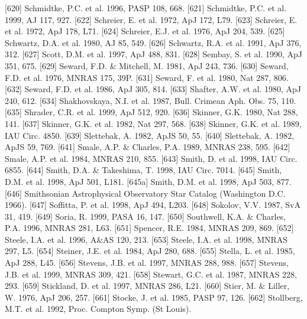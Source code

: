 \documentclass{aa}
\begin{document}
\begin{thebibliography}{}
\bibitem[]{}[620] Schmidtke, P.C. et al. 1996, PASP 108, 668.
\bibitem[]{}[621] Schmidtke, P.C. et al. 1999, AJ 117, 927.
\bibitem[]{}[622] Schreier, E. et al. 1972, ApJ 172, L79.
\bibitem[]{}[623] Schreier, E. et al. 1972, ApJ 178, L71.
\bibitem[]{}[624] Schreier, E.J. et al. 1976, ApJ 204, 539.
\bibitem[]{}[625] Schwartz, D.A. et al. 1980, AJ 85, 549.
\bibitem[]{}[626] Schwartz, R.A. et al. 1991, ApJ 376, 312.
\bibitem[]{}[627] Scott, D.M. et al. 1997, ApJ 488, 831.
\bibitem[]{}[628] Sembay, S. et al. 1990, ApJ 351, 675.
\bibitem[]{}[629] Seward, F.D. \& Mitchell, M. 1981, ApJ 243, 736.
\bibitem[]{}[630] Seward, F.D. et al. 1976, MNRAS 175, 39P.
\bibitem[]{}[631] Seward, F. et al. 1980, Nat 287, 806.
\bibitem[]{}[632] Seward, F.D. et al. 1986, ApJ 305, 814.
\bibitem[]{}[633] Shafter, A.W. et al. 1980, ApJ 240, 612.
\bibitem[]{}[634] Shakhovskaya, N.I. et al. 1987, Bull. Crimean Aph. Obs. 75, 110.
\bibitem[]{}[635] Shrader, C.R. et al. 1999, ApJ 512, 920.
\bibitem[]{}[636] Skinner, G.K. 1980, Nat 288, 141.
\bibitem[]{}[637] Skinner, G.K. et al. 1982, Nat 297, 568.
\bibitem[]{}[638] Skinner, G.K. et al. 1989, IAU Circ. 4850.
\bibitem[]{}[639] Slettebak, A. 1982, ApJS 50, 55.
\bibitem[]{}[640] Slettebak, A. 1982, ApJS 59, 769.
\bibitem[]{}[641] Smale, A.P. \& Charles, P.A. 1989, MNRAS 238, 595.
\bibitem[]{}[642] Smale, A.P. et al. 1984, MNRAS 210, 855.
\bibitem[]{}[643] Smith, D. et al. 1998, IAU Circ. 6855.
\bibitem[]{}[644] Smith, D.A. \& Takeshima, T. 1998, IAU Circ. 7014. 
\bibitem[]{}[645] Smith, D.M. et al. 1998, ApJ 501, L181.
\bibitem[]{}[645a] Smith, D.M. et al. 1998, ApJ 503, 877.
\bibitem[]{}[646] Smithsonian Astrophysical Observatory Star Catalog (Washington D.C. 1966).
\bibitem[]{}[647] Soffitta, P. et al. 1998, ApJ 494, L203.
\bibitem[]{}[648] Sokolov, V.V. 1987, SvA 31, 419.
\bibitem[]{}[649] Soria, R. 1999, PASA 16, 147.
\bibitem[]{}[650] Southwell, K.A. \& Charles, P.A. 1996, MNRAS 281, L63.   
\bibitem[]{}[651] Spencer, R.E. 1984, MNRAS 209, 869.
\bibitem[]{}[652] Steele, I.A. et al. 1996, A\&AS 120, 213.
\bibitem[]{}[653] Steele, I.A. et al. 1998, MNRAS 297, L5.
\bibitem[]{}[654] Steiner, J.E. et al. 1984, ApJ 280, 688.
\bibitem[]{}[655] Stella, L. et al. 1985, ApJ 288, L45.
\bibitem[]{}[656] Stevens, J.B. et al. 1997, MNRAS 288, 988.
\bibitem[]{}[657] Stevens, J.B. et al. 1999, MNRAS 309, 421.
\bibitem[]{}[658] Stewart, G.C. et al. 1987, MNRAS 228, 293.
\bibitem[]{}[659] Stickland, D. et al. 1997, MNRAS 286, L21.
\bibitem[]{}[660] Stier, M. \& Liller, W. 1976, ApJ 206, 257.
\bibitem[]{}[661] Stocke, J. et al. 1985, PASP 97, 126.
\bibitem[]{}[662] Stollberg, M.T. et al. 1992, Proc. Compton Symp. (St Louis).

\end{thebibliography}
\end{document}
